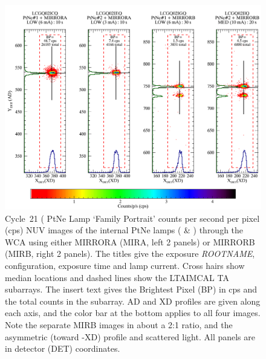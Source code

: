 \begin{figure}[htb]
\noindent\includegraphics[width=1.0\linewidth]{png/C21_13526_FP.png}
\caption[C21 WCA Lamp `Family Portrait']{Cycle~21 ( PtNe Lamp `Family Portrait'
counts per second per pixel (cps) NUV images of the internal PtNe lamps (\plampone{} \& \plamptwo{}) through the
WCA using either MIRRORA (MIRA, left 2 panels) or MIRRORB (MIRB, right 2 panels). The titles
give the exposure \textit{ROOTNAME}, configuration, exposure time and lamp current. Cross hairs show median locations and dashed
lines show the \textsc{LTAIMCAL} TA subarrays.
The insert text gives the Brightest Pixel (BP) in cps and the total counts in the subarray.
AD and XD profiles are given along each axis, and the color bar at the
bottom applies to all four images. Note the separate MIRB images in about a 2:1 ratio, and the asymmetric
(toward -XD) profile and scattered light. All panels are in detector (DET) coordinates.\label{fig:FG21}}
\end{figure}
